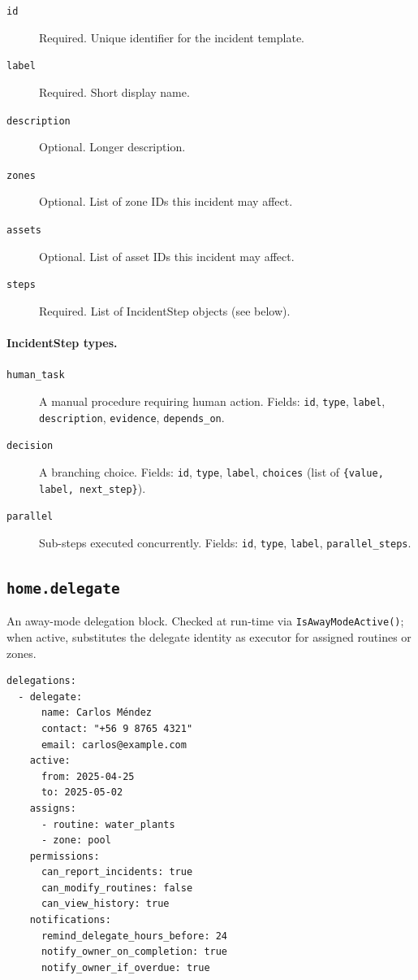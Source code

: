 \begin{description}
  \item[\texttt{id}] Required. Unique identifier for the incident template.
  \item[\texttt{label}] Required. Short display name.
  \item[\texttt{description}] Optional. Longer description.
  \item[\texttt{zones}] Optional. List of zone IDs this incident may affect.
  \item[\texttt{assets}] Optional. List of asset IDs this incident may affect.
  \item[\texttt{steps}] Required. List of IncidentStep objects (see below).
\end{description}

\paragraph{IncidentStep types.}

\begin{description}
  \item[\texttt{human\_task}] A manual procedure requiring human action. Fields:
        \texttt{id}, \texttt{type}, \texttt{label}, \texttt{description}, \texttt{evidence},
        \texttt{depends\_on}.
  \item[\texttt{decision}] A branching choice. Fields: \texttt{id}, \texttt{type},
        \texttt{label}, \texttt{choices} (list of \texttt{\{value, label, next\_step\}}).
  \item[\texttt{parallel}] Sub-steps executed concurrently. Fields: \texttt{id},
        \texttt{type}, \texttt{label}, \texttt{parallel\_steps}.
\end{description}

\subsection{\texttt{home.delegate}}

An away-mode delegation block. Checked at run-time via \texttt{IsAwayModeActive()};
when active, substitutes the delegate identity as executor for assigned routines or zones.

\begin{verbatim}
delegations:
  - delegate:
      name: Carlos Méndez
      contact: "+56 9 8765 4321"
      email: carlos@example.com
    active:
      from: 2025-04-25
      to: 2025-05-02
    assigns:
      - routine: water_plants
      - zone: pool
    permissions:
      can_report_incidents: true
      can_modify_routines: false
      can_view_history: true
    notifications:
      remind_delegate_hours_before: 24
      notify_owner_on_completion: true
      notify_owner_if_overdue: true
\end{verbatim}

